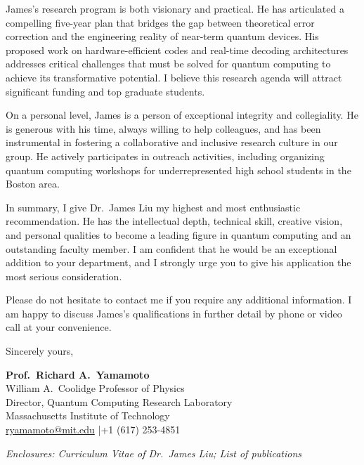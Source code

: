 \documentclass[12pt,a4paper]{article}
\begin{document}
James's research program is both visionary and practical. He has articulated a compelling five-year plan that bridges the gap between theoretical error correction and the engineering reality of near-term quantum devices. His proposed work on hardware-efficient codes and real-time decoding architectures addresses critical challenges that must be solved for quantum computing to achieve its transformative potential. I believe this research agenda will attract significant funding and top graduate students.

On a personal level, James is a person of exceptional integrity and collegiality. He is generous with his time, always willing to help colleagues, and has been instrumental in fostering a collaborative and inclusive research culture in our group. He actively participates in outreach activities, including organizing quantum computing workshops for underrepresented high school students in the Boston area.

In summary, I give Dr.\ James Liu my highest and most enthusiastic recommendation. He has the intellectual depth, technical skill, creative vision, and personal qualities to become a leading figure in quantum computing and an outstanding faculty member. I am confident that he would be an exceptional addition to your department, and I strongly urge you to give his application the most serious consideration.

Please do not hesitate to contact me if you require any additional information. I am happy to discuss James's qualifications in further detail by phone or video call at your convenience.

\vspace{0.8cm}

Sincerely yours,

\vspace{1.2cm}

\textbf{Prof.\ Richard A.\ Yamamoto}\\
William A.\ Coolidge Professor of Physics\\
Director, Quantum Computing Research Laboratory\\
Massachusetts Institute of Technology\\
\href{mailto:ryamamoto@mit.edu}{ryamamoto@mit.edu} \quad|\quad +1 (617) 253-4851

\vspace{1cm}

{\small\color{rulecolor}\textit{Enclosures: Curriculum Vitae of Dr.\ James Liu; List of publications}}
\end{document}
